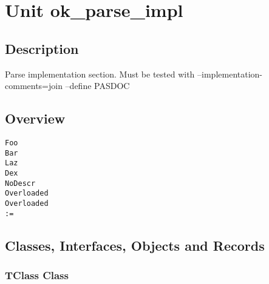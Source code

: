 \documentclass{report}
\newif\ifpdf
\begin{document}
\label{toc}\tableofcontents
\newpage
\newlength{\tmplength}
\chapter{Unit ok{\_}parse{\_}impl}
\label{ok_parse_impl}
\section{Description}
Parse implementation section. Must be tested with --implementation{-}comments=join --define PASDOC
\section{Overview}
\begin{description}
\item[\texttt{\begin{ttfamily}TClass\end{ttfamily} Class}]
\item[\texttt{\begin{ttfamily}TMyType\end{ttfamily} Record}]
\end{description}
\begin{description}
\item[\texttt{Foo}]
\item[\texttt{Bar}]
\item[\texttt{Laz}]
\item[\texttt{Dex}]
\item[\texttt{NoDescr}]
\item[\texttt{Overloaded}]
\item[\texttt{Overloaded}]
\item[\texttt{:=}]
\end{description}
\section{Classes, Interfaces, Objects and Records}
\ifpdf
\subsection*{\large{\textbf{TClass Class}}\normalsize\hspace{1ex}\hrulefill}
\else
\subsection*{TClass Class}
\fi
\label{ok_parse_impl.TClass}
\end{document}
